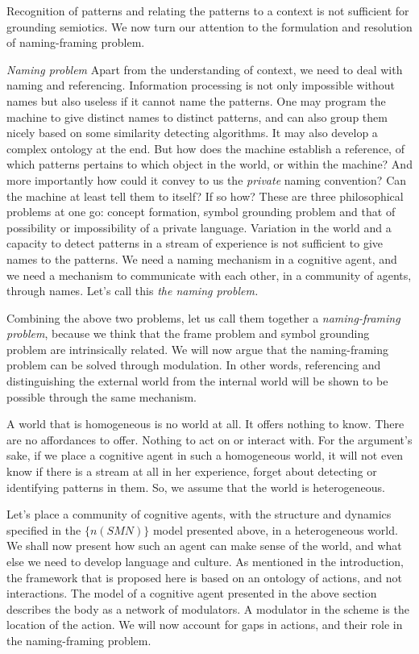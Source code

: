 Recognition of patterns and relating the patterns to a context is not sufficient for grounding semiotics. We now turn our attention to the formulation and resolution of naming-framing problem.

\emph{Naming problem} Apart from the understanding of context, we need to deal with naming and referencing. Information processing is not only impossible without names but also useless if it cannot name the patterns. One may program the machine to give distinct names to distinct patterns, and can also group them nicely based on some similarity detecting algorithms. It may also develop a complex ontology at the end. But how does the machine establish a reference, of which patterns pertains to which object in the world, or within the machine? And more importantly how could it convey to us the \textit{private} naming convention?  Can the machine at least tell them to itself?  If so how? These are three philosophical problems at one go: concept formation, symbol grounding problem and that of possibility or impossibility of a private language. Variation in the world and a capacity to detect patterns in a stream of experience is not sufficient to give names to the patterns. We need a naming mechanism in a cognitive agent, and we need a mechanism to communicate with each other, in a community of agents, through names. Let's call this \textit{the naming problem.} 

Combining the above two problems, let us call them together a \textit{naming-framing problem}, because we think that the frame problem and symbol grounding problem are intrinsically related.
We will now argue that the naming-framing problem can be solved through modulation. In other words, referencing and distinguishing the external world from the internal world will be shown to be possible through the same mechanism.

A world that is homogeneous is no world at all. It offers nothing to know. There are no affordances to offer. Nothing to act on or interact with. For the argument's sake, if we place a cognitive agent in such a homogeneous world, it will not even know if there is a stream at all in her experience, forget about detecting or identifying patterns in them. So, we assume that the world is heterogeneous.   

Let's place a community of cognitive agents, with the structure and dynamics specified in the $\{n(SMN)\}$ model presented above, in a heterogeneous world. We shall now present how such an agent can make sense of the world, and what else we need to develop language and culture. As mentioned in the introduction, the framework that is proposed here is based on an ontology of actions, and not interactions. The model of a cognitive agent presented in the above section describes the body as a network of modulators. A modulator in the scheme is the location of the action. We will now account for gaps in actions, and their role in the naming-framing problem.

